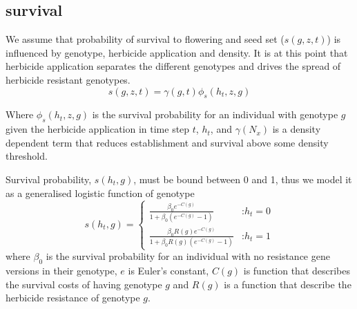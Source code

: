 \documentclass[12pt, a4paper]{article}
\begin{document}
\subsection{survival}   
We assume that probability of survival to flowering and seed set ($s(g, z, t)$) is influenced by genotype, herbicide application and density. It is at this point that herbicide application separates the different genotypes and drives the spread of herbicide resistant genotypes.     
\begin{equation}\label{eq:survival}
	s(g, z, t) = \gamma(g, t)\phi_s(h_t, z, g) 
\end{equation}

Where $\phi_s(h_t, z, g)$ is the survival probability for an individual with genotype $g$ given the herbicide application in time step $t$, $h_t$, and $\gamma(N_x)$ is a density dependent term that reduces establishment and survival above some density threshold.  

Survival probability, $s(h_t, g)$, must be bound between 0 and 1, thus we model it as a generalised logistic function of genotype     
\begin{equation}\label{eq:herb_surv}
	s(h_t, g) =	\begin{cases}
		\frac{\beta_0 e^{-C(g)}}{1 + \beta_0 (e^{-C(g)} - 1)} &\text{:} h_t = 0 \\
		\frac{\beta_0 R(g) e^{-C(g)}}{1 + \beta_0 R(g) (e^{-C(g)} - 1)} &\text{:} h_t = 1
	\end{cases}	
\end{equation}
where $\beta_0$ is the survival probability for an individual with no resistance gene versions in their genotype, $e$ is Euler's constant, $C(g)$ is function that describes the survival costs of having genotype $g$ and $R(g)$ is a function that describe the herbicide resistance of genotype $g$.
\end{document}
